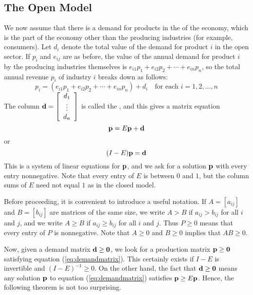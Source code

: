 \documentclass{ximera}
\begin{document}
\subsection*{The Open Model}

We now assume that there is a demand for products in the  of the economy, which is the part of the economy other than the producing industries (for example, consumers). Let $d_{i}$ denote the total value of the demand for product $i$ in the open sector. If $p_{i}$ and $e_{ij}$ are as before, the value of the annual demand for product $i$ by the producing industries themselves is $e_{i1}p_{1} + e_{i2}p_{2} + \cdots + e_{in}p_{n}$, so the total annual revenue $p_{i}$ of industry $i$ breaks down as follows:
\begin{equation*}
p_{i} = (e_{i1}p_{1} + e_{i2}p_{2} + \cdots + e_{in}p_{n}) + d_{i} \quad \mbox{for each } i = 1, 2, \dots, n
\end{equation*}
The column ${\bf d} = \left[ \begin{array}{c}
d_{1} \\
\vdots \\
d_{n}
\end{array} \right]$
 is called the , and this gives a matrix equation
\begin{equation*}
{\bf p} = E{\bf p} + {\bf d}
\end{equation*}
or
\begin{equation}\label{eq:demandmatrix}
(I - E){\bf p} = {\bf d}
\end{equation}
This is a system of linear equations for ${\bf p}$, and we ask for a solution ${\bf p}$ with every entry nonnegative. Note that every entry of $E$ is between $0$ and $1$, but the column sums of $E$ need not equal $1$ as in the closed model.

Before proceeding, it is convenient to introduce a useful notation. If $A = \left[ a_{ij} \right]$ and $B = \left[ b_{ij} \right]$ are matrices of the same size, we write $A > B$ if $a_{ij} > b_{ij}$ for all $i$ and $j$, and we write $A \geq B$ if $a_{ij} \geq b_{ij}$ for all $i$ and $j$. Thus $P \geq 0$ means that every entry of $P$ is nonnegative. Note that $A \geq 0$ and $B \geq 0$ implies that $AB \geq 0$.

Now, given a demand matrix ${\bf d} \geq {\bf 0}$, we look for a production matrix ${\bf p} \geq {\bf 0}$ satisfying equation (\ref{eq:demandmatrix}). This certainly exists if $I - E$ is invertible and $(I - E)^{-1} \geq 0$. On the other hand, the fact that ${\bf d} \geq {\bf 0}$ means any solution ${\bf p}$ to equation (\ref{eq:demandmatrix}) satisfies ${\bf p} \geq E{\bf p}$. Hence, the following theorem is not too surprising.
\end{document}
